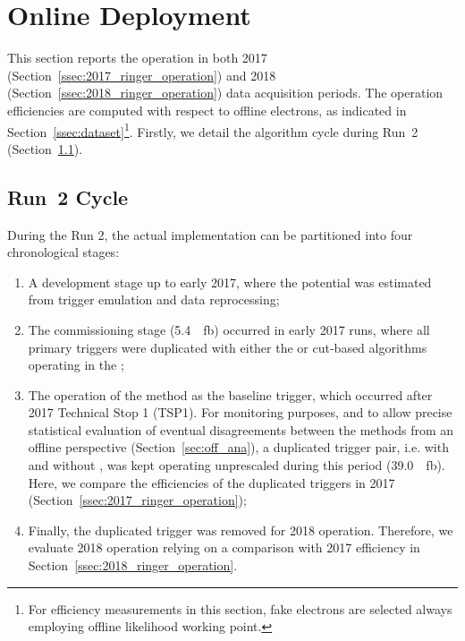 \chapter{Online Deployment}%
\label{sec:operation}



This section reports the \rnn{} operation in both 2017
(Section~\ref{ssec:2017_ringer_operation}) and 2018
(Section~\ref{ssec:2018_ringer_operation}) data acquisition periods. The operation efficiencies
are computed with respect to offline electrons, as indicated in
Section~\ref{ssec:dataset}\footnote{For efficiency measurements in this section,
	fake electrons are selected always employing \veto\vloose{} offline likelihood
	working point.}. Firstly, we detail the algorithm cycle during Run~2
(Section~\ref{ssec:run2_rnn_cycle}).

\section{Run~2 \rnn{} Cycle}\label{ssec:run2_rnn_cycle}

During the Run 2, the actual \rnn{} implementation
can be partitioned into four chronological stages:

\begin{enumerate}[i]
  \item A development stage up to early 2017, where the \rnn{}
      potential was estimated from trigger emulation and data reprocessing;
  \item The commissioning stage (\SI{5.4}{\per\femto\barn}) occurred in
      early 2017 runs, where all primary
      triggers were duplicated with either the \rnn{} or cut-based algorithms
      operating in the \fastcalo{};
  \item The operation of the method as the baseline trigger, which occurred after 2017 Technical Stop 1 (TSP1). For
    monitoring purposes, and to allow precise statistical evaluation of eventual
    disagreements between the \fastcalo{} methods from an offline
    perspective (Section~\ref{sec:off_ana}), a duplicated trigger pair, i.e.
    with and without \rnn{}, was kept operating unprescaled during this period
    (\SI{39.0}{\per\femto\barn}). Here, we compare the efficiencies of the
    duplicated triggers in 2017 (Section~\ref{ssec:2017_ringer_operation});
  \item Finally, the duplicated trigger was removed for 2018 operation.
    Therefore, we evaluate 2018 \rnn{} operation relying on a comparison with
    2017 efficiency in Section~\ref{ssec:2018_ringer_operation}.
\end{enumerate}

